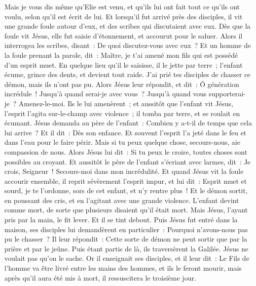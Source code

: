 \begin{multicols}{2}
Mais je vous dis même qu'Elie est venu, et qu'ils lui ont fait tout ce qu'ils ont voulu, selon qu'il est écrit de lui.
Et lorsqu'il fut arrivé près des disciples, il vit une grande foule autour d'eux, et des scribes qui discutaient avec eux.
Dès que la foule vit Jésus, elle fut saisie d'étonnement, et accourut pour le saluer.
Alors il interrogea les scribes, disant~: De quoi discutez-vous avec eux~?
Et un homme de la foule prenant la parole, dit~: Maître, je t'ai amené mon fils qui est possédé d'un esprit muet.
En quelque lieu qu'il le saisisse, il le jette par terre~; l'enfant écume, grince des dents, et devient tout raide. J'ai prié tes disciples de chasser ce démon, mais ils n'ont pas pu.
Alors Jésus leur répondit, et dit~: Ô génération incrédule~! Jusqu'à quand serai-je avec vous~? Jusqu'à quand vous supporterai-je~? Amenez-le-moi. Ils le lui amenèrent~;
et aussitôt que l'enfant vit Jésus, l'esprit l'agita sur-le-champ avec violence~; il tomba par terre, et se roulait en écumant.
Jésus demanda au père de l'enfant~: Combien y a-t-il de temps que cela lui arrive~? Et il dit~: Dès son enfance.
Et souvent l'esprit l'a jeté dans le feu et dans l'eau pour le faire périr. Mais si tu peux quelque chose, secours-nous, aie compassion de nous.
Alors Jésus lui dit~: Si tu peux le croire, toutes choses sont possibles au croyant.
Et aussitôt le père de l'enfant s'écriant avec larmes, dit~: Je crois, Seigneur~! Secours-moi dans mon incrédulité.
Et quand Jésus vit la foule accourir ensemble, il reprit sévèrement l'esprit impur, et lui dit~: Esprit muet et sourd, je te l'ordonne, sors de cet enfant, et n'y rentre plus~!
Et le démon sortit, en poussant des cris, et en l'agitant avec une grande violence. L'enfant devint comme mort, de sorte que plusieurs disaient qu'il était mort.
Mais Jésus, l'ayant pris par la main, le fit lever. Et il se tint debout.
Puis Jésus fut entré dans la maison, ses disciples lui demandèrent en particulier~: Pourquoi n'avons-nous pas pu le chasser~?
Il leur répondit~: Cette sorte de démon ne peut sortir que par la prière et par le jeûne.
Puis étant partis de là, ils traversèrent la Galilée. Jésus ne voulait pas qu'on le sache.
Or il enseignait ses disciples, et il leur dit~: Le Fils de l'homme va être livré entre les mains des hommes, et ils le feront mourir, mais après qu'il aura été mis à mort, il ressuscitera le troisième jour.

\end{multicols}
